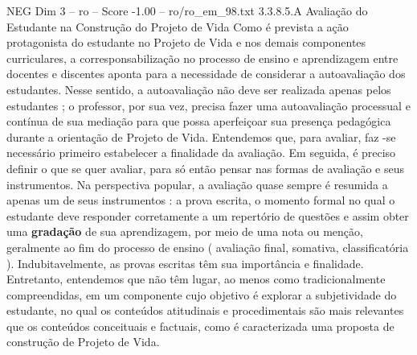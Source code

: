\begin{textsample}{NEG Dim 3 – ro – Score -1.00 – ro/ro\_em\_98.txt}  \label{ex:f3_neg_151}
3.3.8.5.A Avaliação do Estudante na Construção do Projeto de Vida Como é prevista a ação protagonista do estudante no Projeto de Vida e nos demais componentes curriculares, a corresponsabilização no processo de ensino e aprendizagem entre docentes e discentes aponta para a necessidade de considerar a autoavaliação dos estudantes.
Nesse sentido, a autoavaliação não deve ser realizada apenas pelos estudantes ; o professor, por sua vez, precisa fazer uma autoavaliação processual e contínua de sua mediação para que possa aperfeiçoar sua presença pedagógica durante a orientação de Projeto de Vida.
Entendemos que, para avaliar, faz -se necessário primeiro estabelecer a finalidade da avaliação.
Em seguida, é preciso definir o que se quer avaliar, para só então pensar nas formas de avaliação e seus instrumentos.
Na perspectiva popular, a avaliação quase sempre é resumida a apenas um de seus instrumentos : a prova escrita, o momento formal no qual o estudante deve responder corretamente a um repertório de questões e assim obter uma \textbf{gradação} de sua aprendizagem, por meio de uma nota ou menção, geralmente ao fim do processo de ensino ( avaliação final, somativa, classificatória ).
Indubitavelmente, as provas escritas têm sua importância e finalidade.
Entretanto, entendemos que não têm lugar, ao menos como tradicionalmente compreendidas, em um componente cujo objetivo é explorar a subjetividade do estudante, no qual os conteúdos atitudinais e procedimentais são mais relevantes que os conteúdos conceituais e factuais, como é caracterizada uma proposta de construção de Projeto de Vida.

\end{textsample}
